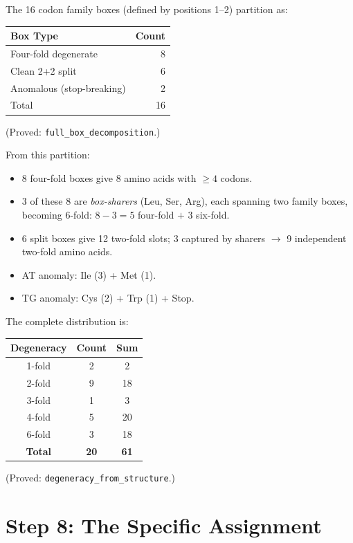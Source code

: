 \documentclass[11pt,twocolumn]{article}
\newcommand{\lean}[1]{\texttt{#1}}
\begin{document}
The 16 codon family boxes (defined by positions 1--2) partition as:
\begin{center}
\begin{tabular}{lr}
\toprule
\textbf{Box Type} & \textbf{Count} \\
\midrule
Four-fold degenerate & 8 \\
Clean 2+2 split & 6 \\
Anomalous (stop-breaking) & 2 \\
\midrule
Total & 16 \\
\bottomrule
\end{tabular}
\end{center}
(Proved: \lean{full\_box\_decomposition}.)

From this partition:
\begin{itemize}
\item 8 four-fold boxes give 8 amino acids with $\geq 4$ codons.
\item 3 of these 8 are \emph{box-sharers} (Leu, Ser, Arg), each
  spanning two family boxes, becoming 6-fold: $8 - 3 = 5$ four-fold
  $+$ 3 six-fold.
\item 6 split boxes give 12 two-fold slots; 3 captured by sharers
  $\to$ 9 independent two-fold amino acids.
\item AT anomaly: Ile (3) + Met (1).
\item TG anomaly: Cys (2) + Trp (1) + Stop.
\end{itemize}

The complete distribution is:
\begin{center}
\begin{tabular}{ccc}
\toprule
\textbf{Degeneracy} & \textbf{Count} & \textbf{Sum} \\
\midrule
1-fold & 2 & 2 \\
2-fold & 9 & 18 \\
3-fold & 1 & 3 \\
4-fold & 5 & 20 \\
6-fold & 3 & 18 \\
\midrule
\textbf{Total} & \textbf{20} & \textbf{61} \\
\bottomrule
\end{tabular}
\end{center}
(Proved: \lean{degeneracy\_from\_structure}.)

\section{Step 8: The Specific Assignment}
\end{document}
